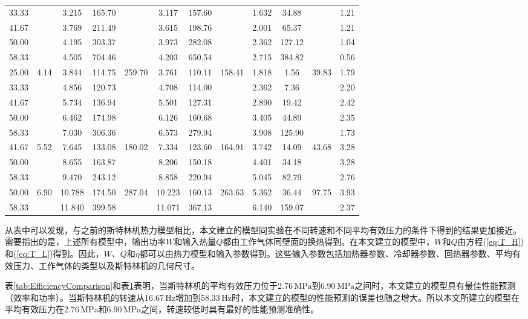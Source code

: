 \begin{table}
\begin{center}
\begin{tabular}{cccccccccccc}
		33.33	&&3.215	&165.70	&&3.117	&157.60	&&1.632	&34.88	&&1.21\\
		41.67	&&3.769	&211.49	&&3.615	&198.76	&&2.001	&65.37	&&1.21\\
		50.00	&&4.195	&303.37	&&3.973	&282.08	&&2.362	&127.12	&&1.04\\
		58.33	&&4.505	&704.46	&&4.203	&650.54	&&2.715	&384.82	&&0.56\\
		\midrule
		25.00	&\multirow{5}{*}{4.14}	&3.844	&114.75	&\multirow{5}{*}{259.70}	&3.761	&110.11	&\multirow{5}{*}{158.41}	&1.818	&1.56	&\multirow{5}{*}{39.83}	&1.79\\
		33.33	&&4.856	&120.73	&&4.708	&114.00	&&2.362	&7.36	&&2.20\\
		41.67	&&5.734	&136.94	&&5.501	&127.31	&&2.890	&19.42	&&2.42\\
		50.00	&&6.462	&174.98	&&6.126	&160.68	&&3.405	&44.89	&&2.35\\
		58.33	&&7.030	&306.36	&&6.573	&279.94	&&3.908	&125.90	&&1.73\\
		\midrule
		41.67	&\multirow{3}{*}{5.52}	&7.645	&133.08	&\multirow{3}{*}{180.02}	&7.334	&123.60	&\multirow{3}{*}{164.91}	&3.742	&14.09	&\multirow{3}{*}{43.68}	&3.28\\
		50.00	&&8.655	&163.87	&&8.206	&150.18	&&4.401	&34.18	&&3.28\\
		58.33	&&9.470	&243.12	&&8.858	&220.94	&&5.045	&82.79	&&2.76\\
		\midrule
		50.00	&\multirow{2}{*}{6.90}	&10.788	&174.50	&\multirow{2}{*}{287.04}	&10.223	&160.13	&\multirow{2}{*}{263.63}	&5.362	&36.44	&\multirow{2}{*}{97.75}		&3.93\\
		58.33	&&11.840	&399.58	&&11.071	&367.13	&&6.140	&159.07	&&2.37\\
		\bottomrule
	\end{tabular}
	\end{center}
	\label{tab:PowerComparison}
\end{table}

从表中可以发现，与之前的斯特林机热力模型相比，本文建立的模型同实验在不同转速和不同平均有效压力的条件下得到的结果更加接近。需要指出的是，上述所有模型中，输出功率$W$和输入热量$Q$都由工作气体同壁面的换热得到。在本文建立的模型中，$W$和$Q$由方程(\ref{eq:T_H})和(\ref{eq:T_L})得到。因此，$W$、$Q$和$\eta$都可以由热力模型和输入参数得到。这些输入参数包括加热器参数、冷却器参数、回热器参数、平均有效压力、工作气体的类型以及斯特林机的几何尺寸。

表\ref{tab:EfficiencyComparison}和表\ref{tab:PowerComparison}表明，当斯特林机的平均有效压力位于2.76$\,\mathrm{MPa}$到6.90$\,\mathrm{MPa}$之间时，本文建立的模型具有最佳性能预测（效率和功率）。当斯特林机的转速从16.67$\,\mathrm{Hz}$增加到58.33$\,\mathrm{Hz}$时，本文建立的模型的性能预测的误差也随之增大。所以本文所建立的模型在平均有效压力在2.76$\,\mathrm{MPa}$和6.90$\,\mathrm{MPa}$之间，转速较低时具有最好的性能预测准确性。

